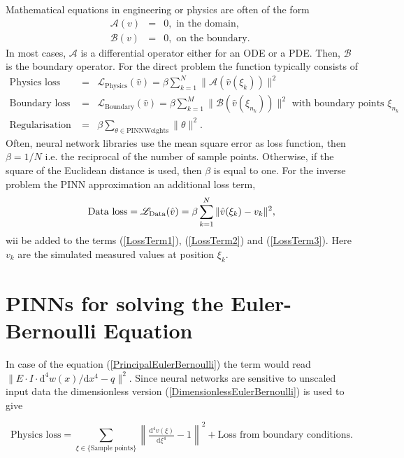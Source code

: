 \documentclass[a4paper,11pt]{article}
\begin{document}
Mathematical equations in engineering or physics are often of the form
\begin{eqnarray*}
\mathscr{A} (v) &=& 0,\text{ in the domain,} \\
\mathscr{B} (v) &=& 0,\text{ on the boundary. }
\end{eqnarray*}
In most cases, $ \mathscr{A} $ is a differential operator either for an ODE or a PDE. Then, $ \mathscr{B} $ is the boundary operator. For the direct problem the function typically consists of
\begin{eqnarray} \label{LossTerm1}
\text{Physics loss } &=& \mathscr{L}_{\mathrm{Physics}} (\hat{v}) =\beta \sum_{k = 1}^N\| \mathscr{A} (\hat{v}(\xi_k) ) \|^2 \\
\text{Boundary loss} &=& \mathscr{L}_{\mathrm{Boundary}} (\hat{v}) = \beta \sum_{k = 1}^M\| \mathscr{B} (\hat{v}(\xi_{n_k}) ) \|^2 \text{ with boundary points  } \xi_{n_k} \label{LossTerm2}\\
\text{Regularisation term} &=& \beta \sum_{\theta \in \mathrm{PINN Weights}}  \| \theta \|^2 . \label{LossTerm3}
\end{eqnarray}
Often, neural network libraries use the mean square error as loss function, then $\beta = 1 /N  $ i.e. the reciprocal of the number of sample points. Otherwise, if the square of the Euclidean distance is used, then $\beta $ is equal to one.
For the inverse problem the PINN approximation an additional loss term,
\begin{equation*}
\text{Data loss} = \mathscr{L}_{\mathrm{Data}} (\hat{v})  = \beta \sum_{k = 1}^N \| \hat{v}(\xi_k)  - v_k \|^2 \\,
\end{equation*}
wii be added to the terms (\ref{LossTerm1}),  (\ref{LossTerm2}) and (\ref{LossTerm3}). Here $ v_k $ are the simulated measured values at position $\xi_k $.

\section{PINNs for solving the Euler-Bernoulli Equation}
In case of the equation (\ref{PrincipalEulerBernoulli}) the term would read $\| E\cdot I \cdot \mathrm{d}^4 w(x) / \mathrm{d}x^4 - q \|^2 $. Since neural networks are sensitive to unscaled input data the dimensionless version (\ref{DimensionlessEulerBernoulli}) is used to give 

\begin{equation*}
\text{Physics loss} = \sum_{\xi \in \{\text{Sample points}\}} \left\| \tfrac{\mathrm{d}^4 v(\xi)}{\mathrm{d}\xi^4} -1 \right\|^2 + \text{Loss from boundary conditions}.
\end{equation*}
\end{document}
